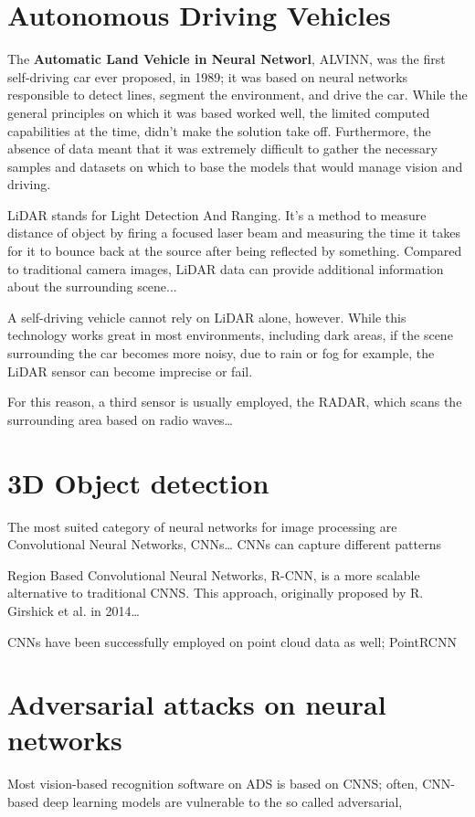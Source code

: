 \newpage
\section{Autonomous Driving Vehicles}
The \textbf{Automatic Land Vehicle in Neural Networl}, ALVINN, was the first self-driving car ever proposed, in 1989; it was based on neural networks responsible to detect lines, segment the environment, and drive the car.
While the general principles on which it was based worked well, the limited computed capabilities at the time, didn't make the solution take off. Furthermore, the absence of data meant that it was extremely difficult to gather the necessary samples and datasets on which to base the models that would manage vision and driving.


LiDAR stands for Light Detection And Ranging. It's a method to measure distance of object by firing a focused laser beam and measuring the time it takes for it to bounce back at the source after being reflected by something.
Compared to traditional camera images, LiDAR data can provide additional information about the surrounding scene...

A self-driving vehicle cannot rely on LiDAR alone, however. While this technology works great in most environments, including dark areas, if the scene surrounding the car becomes more noisy, due to rain or fog for example, the LiDAR sensor can become imprecise or fail.

For this reason, a third sensor is usually employed, the RADAR, which scans the surrounding area based on radio waves\dots


\section{3D Object detection}
The most suited category of neural networks for image processing are Convolutional Neural Networks, CNNs\dots
CNNs can capture different patterns 



Region Based Convolutional Neural Networks, R-CNN, is a more scalable alternative to traditional CNNS. This approach, originally proposed by R. Girshick et al. \cite{DBLP:conf/cvpr/GirshickDDM14} in 2014\dots


CNNs have been successfully employed on point cloud data as well; PointRCNN







\newpage
\section{Adversarial attacks on neural networks}
Most vision-based recognition software on ADS is based on CNNS; often, CNN-based deep learning models are vulnerable to the so called adversarial, 

